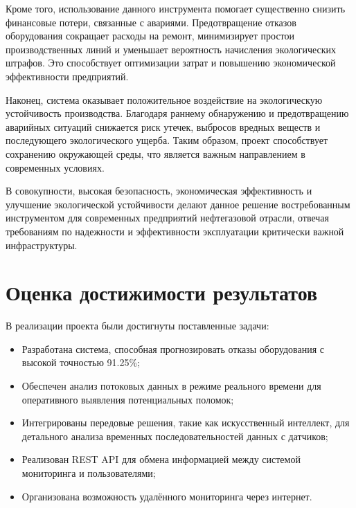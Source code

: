 \documentclass[a4paper,12pt]{article}
\begin{document}
\begin{flushleft}
Кроме того, использование данного инструмента помогает существенно снизить финансовые потери, связанные с авариями. Предотвращение отказов оборудования сокращает расходы на ремонт, минимизирует простои производственных линий и уменьшает вероятность начисления экологических штрафов. Это способствует оптимизации затрат и повышению экономической эффективности предприятий.

Наконец, система оказывает положительное воздействие на экологическую устойчивость производства. Благодаря раннему обнаружению и предотвращению аварийных ситуаций снижается риск утечек, выбросов вредных веществ и последующего экологического ущерба. Таким образом, проект способствует сохранению окружающей среды, что является важным направлением в современных условиях.

В совокупности, высокая безопасность, экономическая эффективность и улучшение экологической устойчивости делают данное решение востребованным инструментом для современных предприятий нефтегазовой отрасли, отвечая требованиям по надежности и эффективности эксплуатации критически важной инфраструктуры.




\section{Оценка достижимости результатов}

В реализации проекта были достигнуты поставленные задачи:
\begin{itemize}
    \item Разработана система, способная прогнозировать отказы оборудования с высокой точностью 91.25\%;
    \item Обеспечен анализ потоковых данных в режиме реального времени для оперативного выявления потенциальных поломок;
    \item Интегрированы передовые решения, такие как искусственный интеллект, для детального анализа временных последовательностей данных с датчиков;
    \item Реализован REST API для обмена информацией между системой мониторинга и пользователями;
    \item Организована возможность удалённого мониторинга через интернет.
\end{itemize}


\end{flushleft}
\end{document}
